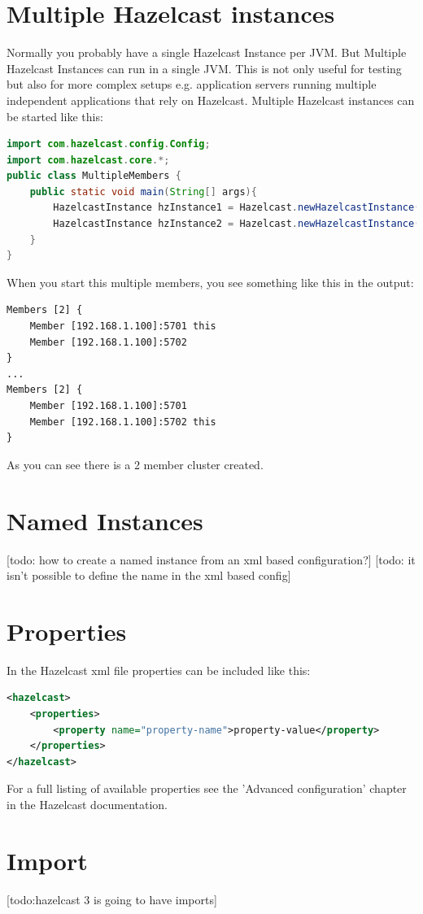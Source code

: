 \section{Multiple Hazelcast instances}
Normally you probably have a single Hazelcast Instance per JVM. But Multiple Hazelcast Instances can run in a single JVM. This is not only useful for testing but also for more complex setups e.g. application servers running multiple independent applications that rely on Hazelcast. Multiple Hazelcast instances can be started like this:
\begin{lstlisting}[language=java]
import com.hazelcast.config.Config;
import com.hazelcast.core.*;
public class MultipleMembers {
    public static void main(String[] args){
        HazelcastInstance hzInstance1 = Hazelcast.newHazelcastInstance();
        HazelcastInstance hzInstance2 = Hazelcast.newHazelcastInstance();
    }
}
\end{lstlisting}
When you start this multiple members, you see something like this in the output:
\begin{lstlisting}
Members [2] {
    Member [192.168.1.100]:5701 this
    Member [192.168.1.100]:5702
}
...
Members [2] {
    Member [192.168.1.100]:5701
    Member [192.168.1.100]:5702 this
}
\end{lstlisting}
As you can see there is a 2 member cluster created.

\section{Named Instances}
[todo: how to create a named instance from an xml based configuration?]
[todo: it isn't possible to define the name in the xml based config]

\section{Properties}
In the Hazelcast xml file properties can be included like this:
\begin{lstlisting}[language=xml]
<hazelcast>
    <properties>
        <property name="property-name">property-value</property>
    </properties>
</hazelcast>
\end{lstlisting}
For a full listing of available properties see the 'Advanced configuration' chapter in the Hazelcast documentation.

\section{Import}
[todo:hazelcast 3 is going to have imports]

